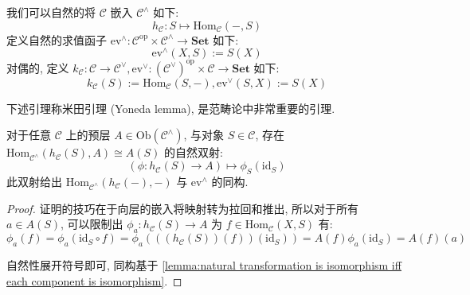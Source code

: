 \begin{definition}
    我们可以自然的将 \(\mathcal{C}\) 嵌入 \(\mathcal{C}^{\wedge}\) 如下:
    \[
        h_{\mathcal{C}} : S \mapsto \mathrm{Hom}_{\mathcal{C}} (-,S)
    \]
    定义自然的求值函子 \(\mathrm{ev}^{\wedge} : \mathcal{C}^{\mathrm{op}} \times \mathcal{C}^{\wedge} \to \mathbf{Set}\) 如下:
    \[
        \mathrm{ev}^{\wedge} (X,S) := S(X)
    \]
    对偶的, 定义 \(k_\mathcal{C} : \mathcal{C} \to \mathcal{C}^{\vee}, \mathrm{ev}^{\vee} : {(\mathcal{C}^{\vee})}^{\mathrm{op}} \times \mathcal{C} \to \mathbf{Set}\) 如下:
    \[
        k_\mathcal{C} (S) := \mathrm{Hom}_{\mathcal{C}} (S,-), \mathrm{ev}^{\vee} (S,X) := S(X)
    \]
\end{definition}

下述引理称米田引理 (Yoneda lemma), 是范畴论中非常重要的引理.

\begin{lemma}[Yoneda]
    \label {lemma:Yoneda lemma}
    对于任意 \(\mathcal{C}\) 上的预层 \(A \in \mathrm{Ob} (\mathcal{C}^{\wedge})\), 与对象 \(S \in \mathcal{C}\), 
    存在 \(\mathrm{Hom}_{\mathcal{C}^{\wedge}} (h_{\mathcal{C}} (S), A) \cong A(S)\) 的自然双射:
    \[
        (\phi : h_{\mathcal{C}} (S) \to A) \mapsto \phi_S (\mathrm{id}_S)
    \]
    此双射给出 \(\mathrm{Hom}_{\mathcal{C}^{\wedge}} (h_{\mathcal{C}} (-), -)\) 与 \(\mathrm{ev}^{\wedge}\) 的同构.

    \begin{proof}
        证明的技巧在于向层的嵌入将映射转为拉回和推出, 所以对于所有 \(a \in A(S)\), 可以限制出 \(\phi_a : h_{\mathcal{C}} (S) \to A\) 为 \(f \in \mathrm{Hom}_{\mathcal{C}} (X,S)\) 有:
        \[
            \phi_a (f) = \phi_a (\mathrm{id}_S \circ f) = \phi_a (((h_{\mathcal{C}} (S)) (f)) (\mathrm{id}_S)) = A(f) \phi_a (\mathrm{id}_S) = A(f) (a)
        \]
        \begin{center}
        \end{center}

        自然性展开符号即可, 同构基于 \ref{lemma:natural transformation is isomorphism iff each component is isomorphism}.
    \end{proof}
\end{lemma}

